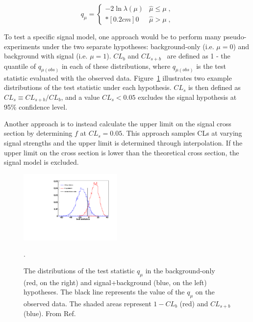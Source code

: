 \begin{equation}
\label{eq:qmu}
q_{\mu} =
\left\{ \! \! \begin{array}{ll}
               - 2 \ln \lambda(\mu)  & \hat{\mu} \le \mu  \;, \\*[0.2 cm]
               0 & \hat{\mu} > \mu \;,
              \end{array}
       \right.
\end{equation}

To test a specific signal model, one approach would be to perform many 
pseudo-experiments under the two separate hypotheses: background-only 
(i.e. $\mu=0$) and background with signal (i.e. $\mu=1$). $CL_{b}$ and 
$CL_{s+b}$~\cite{read,Junk} are defined as 1 - the quantile of $q_{\mu(obs)}$ in each of 
these distributions, where $q_{\mu(obs)}$ is the test statistic evaluated 
with the observed data. Figure~\ref{fig:hybrid_plot} illustrates two example distributions of
the test statistic under each hypothesis.  $CL_{s}$ is then defined as $CL_{s} \equiv CL_{s+b}/CL_{b}$, 
and a value $CL_{s} < 0.05$ excludes the signal hypothesis at 95\% confidence level. 

Another approach is to instead calculate the upper limit on the signal 
cross section by determining $f$ at $CL_{s} = 0.05$.  This approach samples 
CLs at varying signal strengths and the upper limit is 
determined through interpolation. If the upper limit on the cross section 
is lower than the theoretical cross section, the signal model is excluded.

\begin{figure}[h!t]
  \begin{center}
      \includegraphics[width=0.45\textwidth,]{figures/hybrid_plot}
      \caption{\label{fig:hybrid_plot} The distributions of the test statistic $q_{\mu}$
        in the background-only (red, on the right) and signal+background (blue, on the left) hypotheses. 
        The black line represents the value of the $q_{\mu}$ on the observed data. The shaded areas represent 
        $1-CL_{b}$ (red) and $CL_{s+b}$ (blue). From Ref.~\cite{Moneta:1289965}}.
    \label{fig:hybrid_plot}
  \end{center}
\end{figure}

